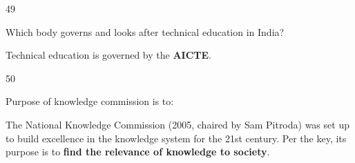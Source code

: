 \begin{question}{49}
{Which body governs and looks after technical education in India?\par}
\begin{explain}
Technical education is governed by the \textbf{AICTE}.
\end{explain}
\end{question}

\begin{question}{50}
{Purpose of knowledge commission is to:\par}
\begin{explain}
The National Knowledge Commission (2005, chaired by Sam Pitroda) was set up to build excellence in the knowledge system for the 21st century. Per the key, its purpose is to \textbf{find the relevance of knowledge to society}.
\end{explain}
\end{question}
